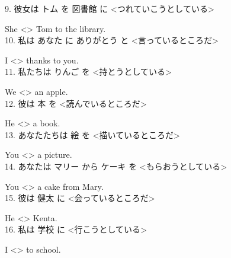 \documentclass[uplatex,
paper=a4,
fontsize=18pt,
jafontsize=16pt,
number_of_lines=30,
line_length=30zh,
baselineskip=25pt,
]{jlreq}
\begin{document}
9.  彼女は トム を 図書館 に <つれていこうとしている>

  She <\hspace{3em}\hspace{3em}\hspace{2em}> Tom to the library.
\\

10.  私は あなた に ありがとう と <言っているところだ>

  I <\hspace{3em}\hspace{3em}\hspace{2em}> thanks to you.
\\

11.  私たちは りんご を <持とうとしている>

  We <\hspace{3em}\hspace{3em}\hspace{2em}> an apple.
\\

12.  彼は 本 を <読んでいるところだ>

  He <\hspace{3em}\hspace{3em}\hspace{2em}> a book.
\\

13.  あなたたちは 絵 を <描いているところだ>

  You <\hspace{3em}\hspace{3em}\hspace{2em}> a picture.
\\

14.  あなたは マリー から ケーキ を <もらおうとしている>

  You <\hspace{3em}\hspace{3em}\hspace{2em}> a cake from Mary.
\\

15.  彼は 健太 に <会っているところだ>

  He <\hspace{3em}\hspace{3em}\hspace{2em}> Kenta.
\\

16.  私は 学校 に <行こうとしている>

  I <\hspace{3em}\hspace{3em}\hspace{2em}> to school.
\\
\end{document}
